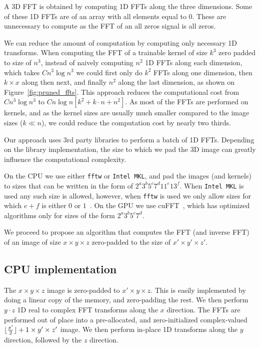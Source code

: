 \documentclass[conference]{./IEEEtran/IEEEtran}
\DeclarePairedDelimiter{\floor}{\lfloor}{\rfloor}
\begin{document}
  A 3D FFT is obtained by computing 1D FFTs along the three
  dimensions.  Some of these 1D FFTs are of an array with all elements
  equal to $0$.  These are unnecessary to compute as the FFT of
  an all zeros signal is all zeros.

  We can reduce the amount of computation by computing only necessary
  1D transforms.  When computing the FFT of a trainable kernel of size
  $k^3$ zero padded to size of $n^3$, instead of naively computing
  $n^2$ 1D FFTs along each dimension, which takes $C n^3 \log n^3$ we
  could first only do $k^2$ FFTs along one dimension, then $k \times
  x$ along then next, and finally $n^2$ along the last dimension, as
  shown on Figure~\ref{fig:pruned_ffts}.  This approach reduces the
  computational cost from $C n^3 \log n^3$ to $C n\log n[k^2 + k \cdot
  n + n^2]$.  As most of the FFTs are performed on kernels, and as the
  kernel sizes are usually much smaller compared to the image sizes
  ($k \ll n$), we could reduce the computation cost by nearly two
  thirds.

  Our approach uses $3$rd party libraries to perform a batch of 1D
  FFTs.  Depending on the library implementation, the size to which we
  pad the 3D image can greatly influence the computational complexity.

  On the CPU we use either {\tt fftw} or {\tt Intel MKL}, and pad the
  images (and kernels) to sizes that can be written in the form of
  $2^a3^b5^c7^d11^e13^f$.  When {\tt Intel MKL} is used any such size
  is allowed, however, when {\tt fftw} is used we only allow sizes for
  which $e+f$ is either $0$ or $1$~\cite{frigo1999fftw,frigo1998fftw}.
  On the GPU we use cuFFT~\cite{nvidia2010cufft}, which has optimized
  algorithms only for sizes of the form $2^a3^b5^c7^d$.

  We proceed to propose an algorithm that computes the FFT (and
  inverse FFT) of an image of size $x \times y \times z$ zero-padded
  to the size of $x' \times y' \times z'$.

\subsection{CPU implementation}
  The $x \times y \times z$ image is zero-padded to $x' \times
  y \times z$.  This is easily implemented by doing a linear copy of
  the memory, and zero-padding the rest. We then perform $y \cdot z$
  1D real to complex FFT transforms along the $x$ direction.  The FFTs
  are performed out of place into a pre-allocated, and
  zero-initialized complex-valued $\floor{\frac{x'}{2}} + 1 \times
  y' \times z'$ image.  We then perform in-place 1D transforms along
  the $y$ direction, followed by the $z$ direction.
\end{document}
